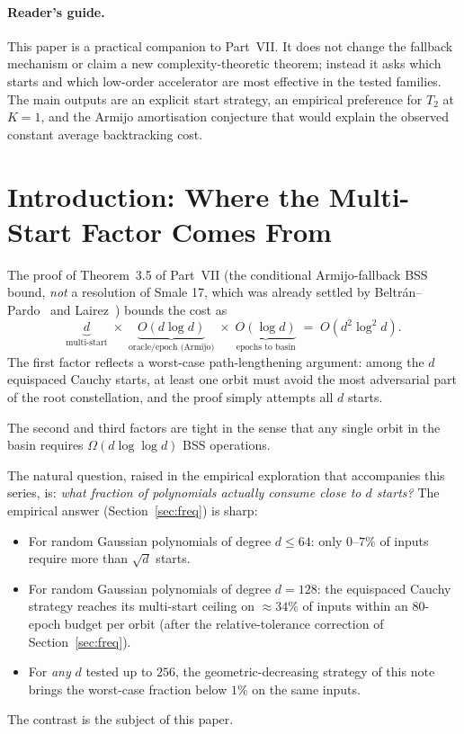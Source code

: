 \documentclass[11pt,a4paper]{article}
\begin{document}
\paragraph{Reader's guide.}
This paper is a practical companion to Part~VII. It does not change the
fallback mechanism or claim a new complexity-theoretic theorem; instead it asks
which starts and which low-order accelerator are most effective in the tested
families. The main outputs are an explicit start strategy, an empirical
preference for $T_2$ at $K=1$, and the Armijo amortisation conjecture that would
explain the observed constant average backtracking cost.

\section{Introduction: Where the Multi-Start Factor Comes From}

The proof of Theorem~3.5 of Part~VII (the conditional Armijo-fallback BSS bound, \emph{not} a resolution of Smale 17, which was already settled by Beltr\'an--Pardo~\cite{beltranpardo} and Lairez~\cite{lairez}) bounds the cost as
$$ \underbrace{d}_{\text{multi-start}} \;\times\; \underbrace{O(d \log d)}_{\text{oracle/epoch (Armijo)}} \;\times\; \underbrace{O(\log d)}_{\text{epochs to basin}} \;=\; O(d^2 \log^2 d). $$
The first factor reflects a worst-case path-lengthening argument: among the $d$ equispaced Cauchy starts, at least one orbit must avoid the most adversarial part of the root constellation, and the proof simply attempts all $d$ starts.

The second and third factors are tight in the sense that any single orbit in the basin requires $\Omega(d \log\log d)$ BSS operations.

\medskip
The natural question, raised in the empirical exploration that accompanies this series, is: \emph{what fraction of polynomials actually consume close to $d$ starts?} The empirical answer (Section~\ref{sec:freq}) is sharp:
\begin{itemize}
\item For random Gaussian polynomials of degree $d \le 64$: only $0$--$7\%$ of inputs require more than $\sqrt{d}$ starts.
\item For random Gaussian polynomials of degree $d = 128$: the equispaced Cauchy strategy reaches its multi-start ceiling on $\approx 34\%$ of inputs within an $80$-epoch budget per orbit (after the relative-tolerance correction of Section~\ref{sec:freq}).
\item For \emph{any} $d$ tested up to $256$, the geometric-decreasing strategy of this note brings the worst-case fraction below $1\%$ on the same inputs.
\end{itemize}
The contrast is the subject of this paper.
\end{document}
